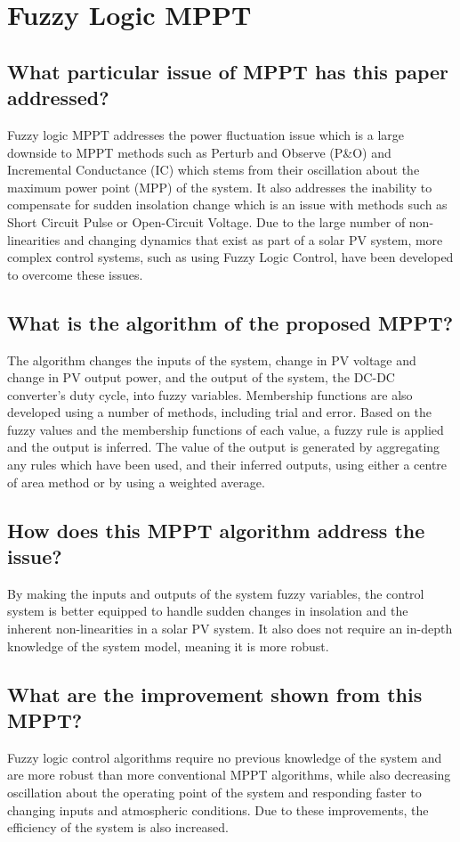\documentclass[]{article}
\begin{document}
	
	\section{Fuzzy Logic MPPT}
		\subsection{What particular issue of MPPT has this paper \parencite{harrabi2017comparative} addressed?}
			Fuzzy logic MPPT addresses the power fluctuation issue which is a large downside to MPPT methods such as Perturb and Observe (P\&O) and Incremental Conductance (IC) which stems from their oscillation about the maximum power point (MPP) of the system. It also addresses  the inability to compensate for sudden insolation change which is an issue with methods such as Short Circuit Pulse or Open-Circuit Voltage. Due to the large number of non-linearities and changing dynamics that exist as part of a solar PV system, more complex control systems, such as using Fuzzy Logic Control, have been developed to overcome these issues.
		\subsection{What is the algorithm of the proposed MPPT?}
			The algorithm changes the inputs of the system, change in PV voltage and change in PV output power, and the output of the system, the DC-DC converter's duty cycle, into fuzzy variables. Membership functions are also developed using a number of methods, including trial and error. Based on the fuzzy values and the membership functions of each value, a fuzzy rule is applied and the output is inferred. The value of the output is generated by aggregating any rules which have been used, and their inferred outputs, using either a centre of area method or by using a weighted average.
		\subsection{How does this MPPT algorithm address the issue?}
			By making the inputs and outputs of the system fuzzy variables, the control system is better equipped to handle sudden changes in insolation and the inherent non-linearities in a solar PV system. It also does not require an in-depth knowledge of the system model, meaning it is more robust.
		\subsection{What are the improvement shown from this MPPT?}
			Fuzzy logic control algorithms require no previous knowledge of the system and are more robust than more conventional MPPT algorithms, while also decreasing oscillation about the operating point of the system and responding faster to changing inputs and atmospheric conditions. Due to these improvements, the efficiency of the system is also increased.
\end{document}

